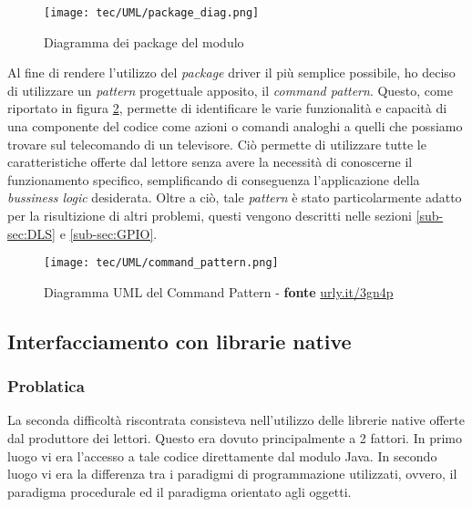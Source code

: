 \begin{figure}[!h] 
    \centering 
    \texttt{[image: tec/UML/package\_diag.png]} 
    \caption{Diagramma dei package del modulo}
    \label{package_diag}
\end{figure}

Al fine di rendere l'utilizzo del \emph{package} driver il più semplice possibile, ho deciso di utilizzare un \emph{pattern} progettuale
apposito, il \emph{command pattern}. Questo, come riportato in figura \ref{command_pattern}, permette di identificare le varie
funzionalità e capacità di una componente del codice come azioni o comandi analoghi a quelli che possiamo trovare sul telecomando
di un televisore. Ciò permette di utilizzare tutte le caratteristiche offerte dal lettore senza avere la necessità di conoscerne il
funzionamento specifico, semplificando di conseguenza l'applicazione della \emph{bussiness logic} desiderata.
Oltre a ciò, tale \emph{pattern} è stato particolarmente adatto per la risultizione di altri problemi, questi vengono descritti 
nelle sezioni \ref{sub-sec:DLS} e \ref{sub-sec:GPIO}.

\begin{figure}[!h] 
    \centering 
    \texttt{[image: tec/UML/command\_pattern.png]} 
    \caption{Diagramma UML del Command Pattern - \textbf{fonte} \url{urly.it/3gn4p}}
    \label{command_pattern}
\end{figure}

\subsection{Interfacciamento con librarie native}
\subsubsection*{Problatica}
La seconda difficoltà riscontrata consisteva nell'utilizzo delle librerie native offerte dal produttore dei lettori.
Questo era dovuto principalmente a 2 fattori. In primo luogo vi era l'accesso a tale codice direttamente dal modulo Java.
In secondo luogo vi era la differenza tra i paradigmi di programmazione utilizzati, ovvero, il paradigma procedurale ed il paradigma
orientato agli oggetti. 

